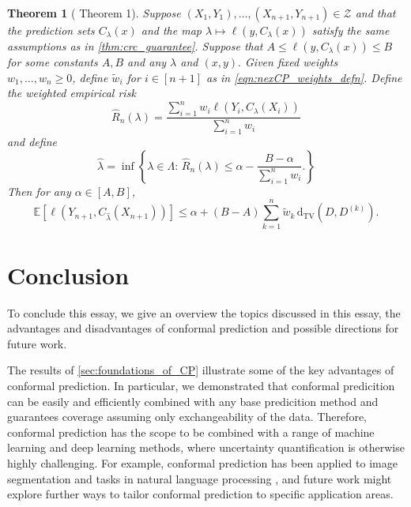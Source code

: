 \documentclass[11pt, titlepage]{article} %
\newcommand{\R}{\mathrm}
\newcommand{\Exp}[3]{\mathbb{E}\left#2 #1 \right#3}
\numberwithin{equation}{section}
\newtheorem{theorem}{Theorem}
\theoremstyle{definition}
\numberwithin{theorem}{section}
\numberwithin{lemma}{section}
\numberwithin{corollary}{section}
\numberwithin{proposition}{section}
\numberwithin{definition}{section}
\numberwithin{remark}{section}
\begin{document}
\begin{theorem}[\cite{farinhas2024nonexchangeable} Theorem 1]
    Suppose \((X_1, Y_1), \ldots, (X_{n+1}, Y_{n+1}) \in \mathcal{Z}\) and that the prediction sets \(C_\lambda(x)\) and the map \(\lambda \mapsto \ell(y, C_\lambda(x))\) satisfy the same assumptions as in \cref{thm:crc_guarantee}. Suppose that \(A \leq \ell(y, C_\lambda(x)) \leq B\) for some constants \(A, B\) and any \(\lambda\) and \((x,y).\) Given fixed weights \(w_1, \ldots, w_n \geq 0\), define \(\tilde{w}_i\) for \(i \in [n+1]\) as in \eqref{eqn:nexCP_weights_defn}. Define the weighted empirical risk \[\hat{R}_n(\lambda) = \frac{\sum_{i=1}^{n} w_i \ell(Y_i, C_\lambda(X_i))}{\sum_{i=1}^{n} w_i}\] and define \[\hat{\lambda} = \inf \left\{ \lambda \in \Lambda : \, \hat{R}_n(\lambda) \leq \alpha - \frac{B - \alpha}{\sum_{i=1}^{n} w_i}. \right\}\] Then for any \(\alpha \in [A,B]\), \[\Exp{\ell(Y_{n+1}, C_{\hat{\lambda}}(X_{n+1}))}{[}{]} \leq \alpha + (B-A)\sum_{k=1}^{n} \tilde{w}_k \, \R{d_{TV}}(D, D^{(k)}).\]
\end{theorem}

\section{Conclusion}

To conclude this essay, we give an overview the topics discussed in this essay, the advantages and disadvantages of conformal prediction and possible directions for future work. \vskip5pt

\noindent
The results of \cref{sec:foundations_of_CP} illustrate some of the key advantages of conformal prediction. In particular, we demonstrated that conformal predicition can be easily and efficiently combined with any base predicition method and guarantees coverage assuming only exchangeability of the data. Therefore, conformal prediction has the scope to be combined with a range of machine learning and deep learning methods, where uncertainty quantification is otherwise highly challenging. For example, conformal prediction has been applied to image segmentation \cite{angelopoulos2024riskcontrol, mossina2024conformal} and tasks in natural language processing \cite{campos2024conformalpredictionnaturallanguage, cherian2024large}, and future work might explore further ways to tailor conformal prediction to specific application areas. \vskip5pt
\end{document}
